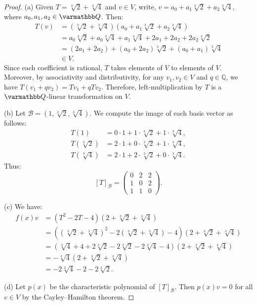 \documentclass[10pt,oneside,openany]{memoir}
\begin{document}
{\color{blue}

	\begin{proof}
		(a) Given \(T=\sqrt[3]{2}+\sqrt[3]{4}\) and \(v\in V\), write, \(v=a_0+a_1\sqrt[3]{2}+a_2\sqrt[3]{4}\), where \(a_0,a_1,a_2\in\bfQ\). Then:
		\begin{align*}
			T(v)
&= \left(\sqrt[3]{2}+\sqrt[3]{4}\right)
   \left(a_0+a_1\sqrt[3]{2}+a_2\sqrt[3]{4}\right) \\
&= a_0\sqrt[3]{2}+a_0\sqrt[3]{4}
   +a_1\sqrt[3]{4}+2a_1+2a_2+2a_2\sqrt[3]{2} \\
&= (2a_1+2a_2)+(a_0+2a_2)\sqrt[3]{2}
   +(a_0+a_1)\sqrt[3]{4} \\
&\in V.
		\end{align*}
		Since each coefficient is rational, \(T\) takes elements of \(V\) to elements of \(V\). Moreover, by associativity and distributivity, for any \(v_1,v_2\in V\) and \(q\in\mathbb{Q}\), we have $T(v_1+qv_2)=Tv_1+qTv_2$. Therefore, left-multiplication by \(T\) is a \(\bfQ\)-linear transformation on \(V\).

		(b) Let \(\mathcal{B}=(1,\sqrt[3]{2},\sqrt[3]{4})\). We compute the image of each basis vector as follows:
		\begin{align*}
			T(1)
&= 0\cdot 1+1\cdot\sqrt[3]{2}+1\cdot\sqrt[3]{4}, \\
T\left(\sqrt[3]{2}\right)
&= 2\cdot 1+0\cdot\sqrt[3]{2}+1\cdot\sqrt[3]{4}, \\
T\left(\sqrt[3]{4}\right)
&= 2\cdot 1+2\cdot\sqrt[3]{2}+0\cdot\sqrt[3]{4}.
		\end{align*}
		Thus:
		\[
			[T]_{\mathcal{B}}
=
\begin{pmatrix}
0 & 2 & 2 \\
1 & 0 & 2 \\
1 & 1 & 0
\end{pmatrix}.
		\] 

		(c) We have:
		\begin{align*}
			f(x)v
&= (T^2-2T-4)\left(2+\sqrt[3]{2}+\sqrt[3]{4}\right) \\
&= \left(\left(\sqrt[3]{2}+\sqrt[3]{4}\right)^2
-2\left(\sqrt[3]{2}+\sqrt[3]{4}\right)-4\right)
\left(2+\sqrt[3]{2}+\sqrt[3]{4}\right) \\
&= \left(\sqrt[3]{4}+4+2\sqrt[3]{2}
-2\sqrt[3]{2}-2\sqrt[3]{4}-4\right)
\left(2+\sqrt[3]{2}+\sqrt[3]{4}\right) \\
&= -\sqrt[3]{4}\left(2+\sqrt[3]{2}+\sqrt[3]{4}\right) \\
&= -2\sqrt[3]{4}-2-2\sqrt[3]{2}.
		\end{align*}

		(d) Let \(p(x)\) be the characteristic polynomial of \([T]_{\mathcal{B}}\). Then \(p(x)v=0\) for all \(v\in V\) by the Cayley--Hamilton theorem.
	\end{proof}
}
\end{document}
